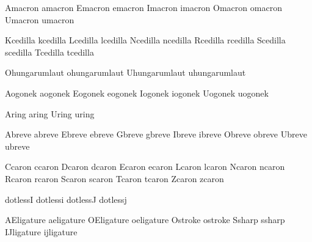  Amacron amacron
 Emacron emacron
 Imacron imacron
 Omacron omacron
 Umacron umacron

 Kcedilla kcedilla
 Lcedilla lcedilla
 Ncedilla ncedilla
 Rcedilla rcedilla
 Scedilla scedilla
 Tcedilla tcedilla

 Ohungarumlaut ohungarumlaut
 Uhungarumlaut uhungarumlaut

 Aogonek aogonek
 Eogonek eogonek
 Iogonek iogonek
 Uogonek uogonek

 Aring aring
 Uring uring

 Abreve abreve
 Ebreve ebreve
 Gbreve gbreve
 Ibreve ibreve
 Obreve obreve
 Ubreve ubreve

 Ccaron ccaron
 Dcaron dcaron
 Ecaron ecaron
 Lcaron lcaron
 Ncaron ncaron
 Rcaron rcaron
 Scaron scaron
 Tcaron tcaron
 Zcaron zcaron

 dotlessI dotlessi
 dotlessJ dotlessj

 AEligature aeligature
 OEligature oeligature
 Ostroke    ostroke
 Ssharp     ssharp
 IJligature ijligature

\endinput
